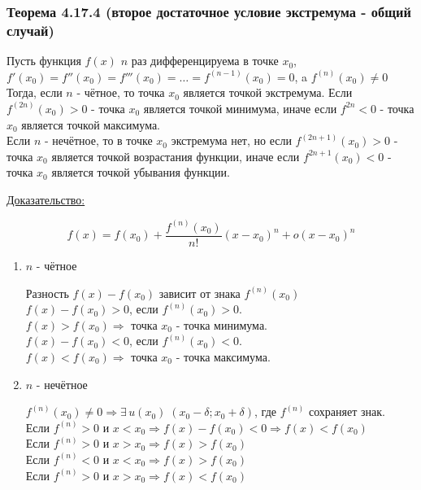 \documentclass[12pt]{article}
\begin{document}
    \subsubsection*{Теорема 4.17.4 (второе достаточное условие экстремума -  общий случай)}\label{th:4.17.4}
    Пусть функция $f(x)$ $n$ раз дифференцируема в точке $x_0$, $f'(x_0) = f''(x_0)=f'''(x_0)=\dots=f^{(n-1)}(x_0)=0$, a $f^{(n)}(x_0) \ne 0$\\
    Тогда, если $n$ - чётное, то точка $x_0$ является точкой экстремума. Если $f^{(2n)}(x_0)>0$ - точка $x_0$ является точкой минимума, иначе если $f^{2n}<0$ - точка $x_0$ является точкой максимума.\\
    Если $n$ - нечётное, то в точке $x_0$ экстремума нет, но если $f^{(2n+1)}(x_0)>0$ - точка $x_0$ является точкой возрастания функции, иначе если $f^{2n+1}(x_0)<0$ - точка $x_0$ является точкой убывания функции.
    \par\noindent
    \underline{Доказательство:}
    \begin{adjustwidth}{1.5em}{1.5em}
        \[ f(x)=f(x_0)+\frac{f^{(n)}(x_0)}{n!}(x-x_0)^n+o(x-x_0)^n \]
        \begin{enumerate}
            \item $n$ - чётное\par\noindent
            Разность $f(x)-f(x_0)$ зависит от знака $f^{(n)}(x_0)$\\
            $f(x)-f(x_0)>0$, если $f^{(n)}(x_0)>0$.\\
            $f(x)>f(x_0) \Rightarrow$ точка $x_0$ - точка минимума.\\
            $f(x)-f(x_0)<0$, если $f^{(n)}(x_0)<0$.\\
            $f(x)<f(x_0) \Rightarrow $ точка $x_0$ - точка максимума.
            \item $n$ - нечётное\par\noindent
            $f^{(n)}(x_0)\ne 0 \Rightarrow \exists\,u(x_0) \; (x_0-\delta;x_0+\delta)$, где $f^{(n)}$ сохраняет знак.\\
            Если $f^{(n)}>0$ и $x<x_0 \Rightarrow f(x)-f(x_0)<0 \Rightarrow f(x)<f(x_0)$\\
            Если $f^{(n)}>0$ и $x>x_0 \Rightarrow f(x)>f(x_0)$\\
            Если $f^{(n)}<0$ и $x<x_0 \Rightarrow f(x)>f(x_0)$\\
            Если $f^{(n)}>0$ и $x>x_0 \Rightarrow f(x)<f(x_0)$
        \end{enumerate}
    \end{adjustwidth}
\end{document}
